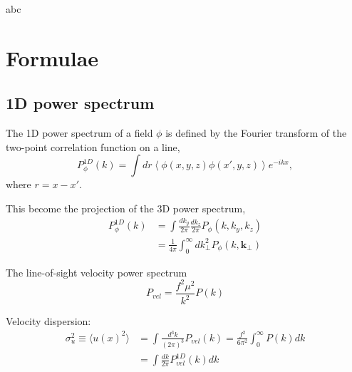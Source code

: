 \documentclass[a4paper,11pt]{article}
\begin{document}
abc

\section{Formulae}
\subsection{1D power spectrum}

The 1D power spectrum of a field $\phi$ is defined by the Fourier transform of the two-point correlation function on a line,
\begin{equation}
  P_\phi^{1D}(k) = \int \! dr
                  \left\langle \phi(x, y, z) \phi(x', y, z) \right\rangle
                  e^{-ikx},
\end{equation}
where $r = x - x'$.

This become the projection of the 3D power spectrum,
\begin{align}
  P_\phi^{1D}(k) &= \int \! \frac{dk_y}{2\pi} \frac{dk_z}{2\pi}
                   P_\phi(k, k_y, k_z)\\
                &= \frac{1}{4\pi} \int_0^\infty d k_\perp^2 P_\phi(k, \bm{k}_\perp) 
\end{align}

The line-of-sight velocity power spectrum
\begin{equation}
  P_{vel} = \frac{f^2 \mu^2}{k^2} P(k)
\end{equation}

Velocity dispersion:
\begin{align}
  \sigma_u^2 \equiv \langle u(x)^2 \rangle
  &= \int \! \frac{d^3 k}{(2\pi)^3} P_{vel}(k)
   = \frac{f^2}{6\pi^2} \int_0^\infty P(k) dk \\
  &= \int \frac{dk}{2\pi} P^{1D}_{vel}(k) dk
\end{align}

\label{LastPage}
\end{document}
